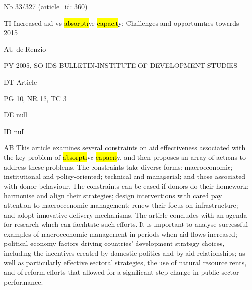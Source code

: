 \documentclass[a4paper]{article}
\begin{document}
\vspace*{-2cm}
Nb \tabto{0cm}33/327 (article\_id: 360)\par
TI \tabto{0cm}Increased aid vs \hl{absorpti}ve \hl{capacit}y: Challenges and opportunities towards 2015\par
AU \tabto{0cm}de Renzio\par
PY \tabto{0cm}2005, SO IDS BULLETIN-INSTITUTE OF DEVELOPMENT STUDIES\par
DT \tabto{0cm}Article\par
PG \tabto{0cm}10, NR 13, TC 3\par
DE \tabto{0cm}null\par
ID \tabto{0cm}null\par
AB \tabto{0cm}This article examines several constraints on aid effectiveness associated with the key problem of \hl{absorpti}ve \hl{capacit}y, and then proposes an array of actions to address these problems. The constraints take diverse forms: macroeconomic; institutional and policy-oriented; technical and managerial; and those associated with donor behaviour. The constraints can be eased if donors do their homework; harmonise and align their strategies; design interventions with cared pay attention to macroeconomic management; renew their focus on infrastructure; and adopt innovative delivery mechanisms. The article concludes with an agenda for research which can facilitate such efforts. It is important to analyse successful examples of macroeconomic management in periods when aid flows increased; political economy factors driving countries' development strategy choices, including the incentives created by domestic politics and by aid relationships; as well as particularly effective sectoral strategies, the use of natural resource rents, and of reform efforts that allowed for a significant step-change in public sector performance.\par
\clearpage
\end{document}
